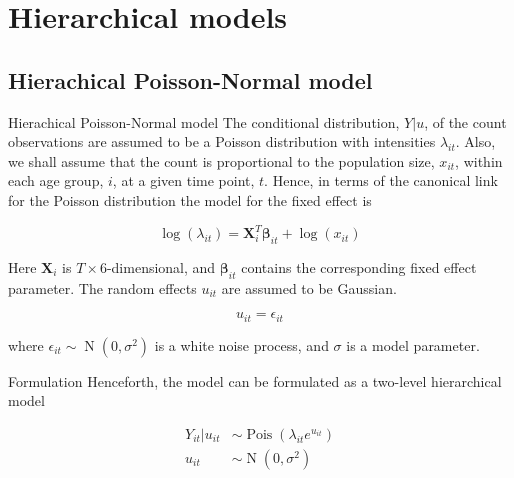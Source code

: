 \documentclass[aspectratio=169]{beamer}
\DeclareMathOperator{\N}{N}
\DeclareMathOperator{\Pois}{Pois}
\begin{document}
\hypertarget{hierarchical-models}{%
\section{Hierarchical models}\label{hierarchical-models}}

\hypertarget{hierachical-poisson-normal-model}{%
\subsection{Hierachical Poisson-Normal
model}\label{hierachical-poisson-normal-model}}

\begin{frame}{Hierachical Poisson-Normal model}
The conditional distribution, \(Y|u\), of the count observations are
assumed to be a Poisson distribution with intensities \(\lambda_{it}\).
Also, we shall assume that the count is proportional to the population
size, \(x_{it}\), within each age group, \(i\), at a given time point,
\(t\). Hence, in terms of the canonical link for the Poisson
distribution the model for the fixed effect is

\begin{equation}
  \log(\lambda_{it})=\mathbf{X}_i^T\mathbf{\beta}_{it}+\log(x_{it})
\end{equation}

Here \(\mathbf{X}_i\) is \(T\times6\)-dimensional, and
\(\mathbf{\beta}_{it}\) contains the corresponding fixed effect
parameter. The random effects \(u_{it}\) are assumed to be Gaussian.

\begin{equation}
  u_{it} = \epsilon_{it}
\end{equation}

where \(\epsilon_{it}\sim\N(0,\sigma^2)\) is a white noise process, and
\(\sigma\) is a model parameter.
\end{frame}

\begin{frame}{Formulation}
\protect\hypertarget{formulation}{}
Henceforth, the model can be formulated as a two-level hierarchical
model

\begin{subequations}
  \begin{alignat}{2}
    Y_{it}|u_{it} &\sim \Pois (\lambda_{it}e^{u_{it}}) \label{eq:pois_ln0} \\ 
    u_{it} &\sim \N(0,\sigma^2) \label{eq:pois_ln1}
  \end{alignat}
\end{subequations}
\end{frame}
\end{document}

